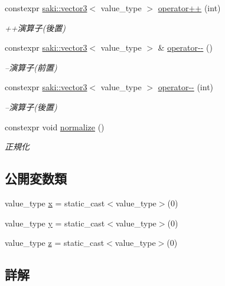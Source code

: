 \begin{DoxyCompactItemize}
constexpr \mbox{\hyperlink{classsaki_1_1vector3}{saki\+::vector3}}$<$ value\+\_\+type $>$ \mbox{\hyperlink{classsaki_1_1vector3_a2310ac18d9b37a8ab6d967bfd9720998}{operator++}} (int)
\begin{DoxyCompactList}\small\item\em ++演算子(後置) \end{DoxyCompactList}\item 
constexpr \mbox{\hyperlink{classsaki_1_1vector3}{saki\+::vector3}}$<$ value\+\_\+type $>$ \& \mbox{\hyperlink{classsaki_1_1vector3_ae72c214f2b976854cc8f87009eb34956}{operator-\/-\/}} ()
\begin{DoxyCompactList}\small\item\em --演算子(前置) \end{DoxyCompactList}\item 
constexpr \mbox{\hyperlink{classsaki_1_1vector3}{saki\+::vector3}}$<$ value\+\_\+type $>$ \mbox{\hyperlink{classsaki_1_1vector3_a9b3a81278ca27fc7fc43417c47cb80a4}{operator-\/-\/}} (int)
\begin{DoxyCompactList}\small\item\em --演算子(後置) \end{DoxyCompactList}\item 
constexpr void \mbox{\hyperlink{classsaki_1_1vector3_af99372de14e9ddba3eba28327c555930}{normalize}} ()
\begin{DoxyCompactList}\small\item\em 正規化 \end{DoxyCompactList}\end{DoxyCompactItemize}
\subsection*{公開変数類}
\begin{DoxyCompactItemize}
\item 
value\+\_\+type \mbox{\hyperlink{classsaki_1_1vector3_af3c83fc9c183501a5cfd42f33cac21df}{x}} = static\+\_\+cast$<$value\+\_\+type$>$(0)
\item 
value\+\_\+type \mbox{\hyperlink{classsaki_1_1vector3_a5ecb4148ebb05a45be8371459a57b1b2}{y}} = static\+\_\+cast$<$value\+\_\+type$>$(0)
\item 
value\+\_\+type \mbox{\hyperlink{classsaki_1_1vector3_a910df22d3a9c3a2da377756454f3b645}{z}} = static\+\_\+cast$<$value\+\_\+type$>$(0)
\end{DoxyCompactItemize}


\subsection{詳解}
